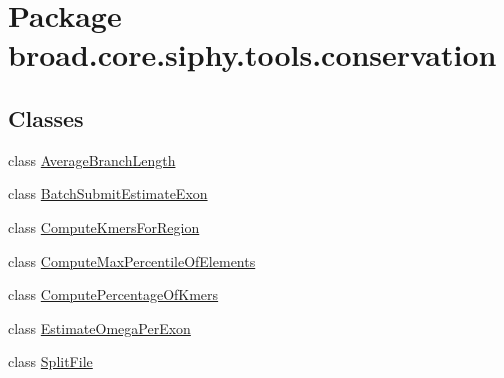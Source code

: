 \hypertarget{namespacebroad_1_1core_1_1siphy_1_1tools_1_1conservation}{\section{Package broad.\+core.\+siphy.\+tools.\+conservation}
\label{namespacebroad_1_1core_1_1siphy_1_1tools_1_1conservation}
}
\subsection*{Classes}
\begin{DoxyCompactItemize}
\item 
class \hyperlink{classbroad_1_1core_1_1siphy_1_1tools_1_1conservation_1_1_average_branch_length}{Average\+Branch\+Length}
\item 
class \hyperlink{classbroad_1_1core_1_1siphy_1_1tools_1_1conservation_1_1_batch_submit_estimate_exon}{Batch\+Submit\+Estimate\+Exon}
\item 
class \hyperlink{classbroad_1_1core_1_1siphy_1_1tools_1_1conservation_1_1_compute_kmers_for_region}{Compute\+Kmers\+For\+Region}
\item 
class \hyperlink{classbroad_1_1core_1_1siphy_1_1tools_1_1conservation_1_1_compute_max_percentile_of_elements}{Compute\+Max\+Percentile\+Of\+Elements}
\item 
class \hyperlink{classbroad_1_1core_1_1siphy_1_1tools_1_1conservation_1_1_compute_percentage_of_kmers}{Compute\+Percentage\+Of\+Kmers}
\item 
class \hyperlink{classbroad_1_1core_1_1siphy_1_1tools_1_1conservation_1_1_estimate_omega_per_exon}{Estimate\+Omega\+Per\+Exon}
\item 
class \hyperlink{classbroad_1_1core_1_1siphy_1_1tools_1_1conservation_1_1_split_file}{Split\+File}
\end{DoxyCompactItemize}
